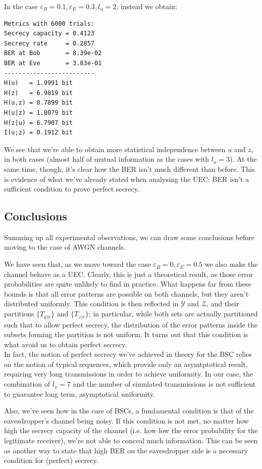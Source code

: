 \documentclass[a4paper,12pt,titlepage]{article}
\begin{document}
In the case $\varepsilon_B = 0.1, \varepsilon_E = 0.3, l_u = 2$, instead we
obtain:
\begin{verbatim}
Metrics with 6000 trials:
Secrecy capacity = 0.4123
Secrecy rate     = 0.2857
BER at Bob       = 8.39e-02
BER at Eve       = 3.83e-01
-------------------------
H(u)   = 1.9991 bit
H(z)   = 6.9819 bit
H(u,z) = 8.7899 bit
H(u|z) = 1.8079 bit
H(z|u) = 6.7907 bit
I(u;z) = 0.1912 bit
\end{verbatim}

We see that we're able to obtain more statistical independence between $u$ and
$z$, in both cases (almost half of mutual information as the cases with $l_u
=3$). At the same time, though, it's clear how the BER isn't much different
than before. This is evidence of what we've already stated when analyzing the
UEC: BER isn't a sufficient condition to prove perfect secrecy.

\subsection*{Conclusions}
Summing up all experimental observations, we can draw some conclusions before
moving to the case of AWGN channels.

We have seen that, as we move toward the case $\varepsilon_B = 0, \varepsilon_E
= 0.5$ we also make the channel behave as a UEC. Clearly, this is just a
theoretical result, as those error probabilities are quite unlikely to find in
practice. What happens far from these bounds is that all error patterns are
possible on both channels, but they aren't distributed uniformly. This
condition is then reflected in $\mathcal{Y}$ and $\mathcal{Z}$, and their
partitions $\{T_{y|x}\}$ and $\{T_{z|x}\}$; in particular, while both sets are
actually partitioned such that to allow perfect secrecy, the distribution of
the error patterns inside the subsets forming the partition is not uniform. It
turns out that this condition is what avoid us to obtain perfect secrecy. \\
In fact, the notion of perfect secrecy we've achieved in theory for the BSC
relies on the notion of typical sequences, which provide only an asymtptotical
result, requiring very long transmissions in order to achieve uniformity. In
our case, the combination of $l_x = 7$ and the number of simulated
transmissions is not sufficient to guarantee long term, asymptotical
uniformity.

Also, we've seen how in the case of BSCs, a fundamental condition is that of
the eavesdropper's channel being noisy. If this condition is not met, no matter
how high the secrecy capacity of the channel (i.e. how low the error
probability for the legitimate receiver), we're not able to conceal much
information. This can be seen as another way to state that high BER on the
eavesdropper side is a necessary condition for (perfect) secrecy.
\end{document}
